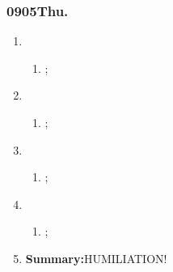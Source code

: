 \subsubsection{0905Thu.}
\begin{enumerate}
	\item \ncquaone
	\begin{enumerate}[(1)]
		\item ;\rightundoneBlack
	\end{enumerate}
	
	\item \ncquatwo	
	\begin{enumerate}[(1)]
		\item ;\rightundoneBlack
	\end{enumerate}
	
	\item \ncquathree
	\begin{enumerate}[(1)]
		\item ;\rightundoneBlack
	\end{enumerate}
	
	\item \ncquafour	
	\begin{enumerate}[(1)]
		\item ;\rightundoneBlack
	\end{enumerate}
	\item \textbf{Summary:}HUMILIATION! 
\end{enumerate}
